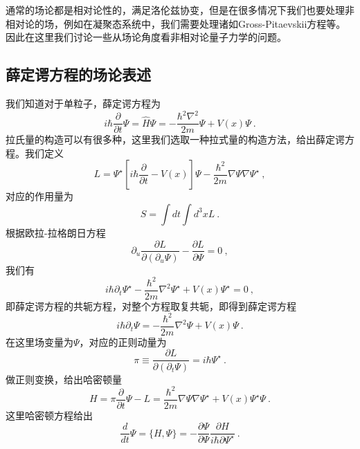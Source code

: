 
\begin{issues}
\issueDraft
\end{issues}

通常的场论都是相对论性的，满足洛伦兹协变，但是在很多情况下我们也要处理非相对论的场，例如在凝聚态系统中，我们需要处理诸如Gross-Pitaevskii方程等。因此在这里我们讨论一些从场论角度看非相对论量子力学的问题。
\subsection{薛定谔方程的场论表述}
我们知道对于单粒子，薛定谔方程为
\begin{equation}
i\hbar \frac{\partial}{\partial t} \Psi = \hat{H} \Psi = -\frac{\hbar^2 \nabla^2}{2m} \Psi + V(x)\Psi ~.
\end{equation}
拉氏量的构造可以有很多种，这里我们选取一种拉式量的构造方法，给出薛定谔方程。我们定义
$$
L =  \Psi^\star [i\hbar \frac{\partial}{\partial t}  - V(x)]\Psi - \frac{\hbar^2}{2m}\nabla \Psi \nabla \Psi^\star~,
$$
对应的作用量为
$$
S = \int dt \int d^3 x L~.
$$
根据欧拉-拉格朗日方程
$$
\partial_u \frac{\partial L}{\partial (\partial_u \Psi)} - \frac{\partial L}{\partial \Psi}=0 ~,
$$
我们有
$$
i\hbar \partial_t \Psi^\star - \frac{\hbar^2}{2m}\nabla^2 \Psi^\star + V(x)\Psi^\star=0 ~,
$$
即薛定谔方程的共轭方程，对整个方程取复共轭，即得到薛定谔方程
$$
i\hbar \partial_t \Psi = -\frac{\hbar^2}{2m}\nabla^2 \Psi + V(x)\Psi ~.
$$
在这里场变量为$\Psi$，对应的正则动量为
$$
\pi \equiv \frac{\partial L}{\partial (\partial_t \Psi)} = i\hbar \Psi^\star~.
$$
做正则变换，给出哈密顿量
$$
H = \pi \frac{\partial}{\partial t}\Psi - L =  \frac{\hbar^2}{2m} \nabla\Psi \nabla \Psi^\star+ V(x)\Psi^\star\Psi~.
$$
这里哈密顿方程给出
$$
\frac{d}{d t}\Psi = \{H,\Psi\} = -\frac{\partial \Psi}{\partial \Psi}\frac{\partial H}{i\hbar \partial \Psi^\star}~.
$$
